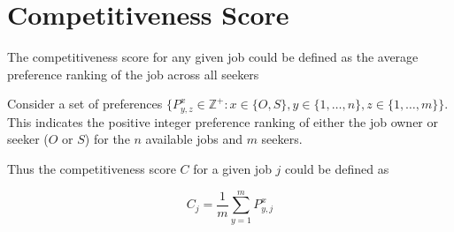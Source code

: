 \section{Competitiveness Score}

The competitiveness score for any given job could be defined as the average preference ranking of the job across all seekers

Consider a set of preferences $\{P^{x}_{y,z} \in \mathbb{Z}^+: x \in \{O,S\}, y \in \{1, \dots, n\}, z \in \{1, \dots, m\}\}$. This indicates the positive integer preference ranking of either the job owner or seeker ($O$ or $S$) for the $n$ available jobs and $m$ seekers. 

Thus the competitiveness score $C$ for a given job $j$ could be defined as 

\[C_j = \frac{1}{m}\sum_{y=1}^m P^{x}_{y,j}\]